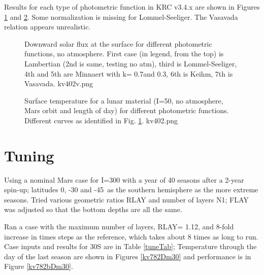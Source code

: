 \documentclass{article}
\begin{document}
Results for each type of photometric function in KRC v3.4.x are shown in Figures
\ref{kv402v} and \ref{kv402}. Some normalization is missing for
Lommel-Seeliger. The Vasavada relation appears unrealistic.
 
\begin{figure}[!ht] 
\caption[DownVis for photometric functions]{Downward solar flux at the surface
  for different photometric functions, no atmosphere. First case (in legend,
  from the top) is Lambertian (2nd is same, testing no atm), third is
  Lommel-Seeliger, 4th and 5th are Minnaert with k= 0.7and 0.3, 6th is Keihm,
  7th is Vasavada.
\label{kv402v}  kv402v.png }
\end{figure} 
 
\begin{figure}[!ht] 
\caption[Tsurf for photometric functions]{Surface temperature for a lunar
  material (I=50, no atmosphere, Mars orbit and length of day) for different
  photometric functions. Different curves as identified in Fig. \ref{kv402v}.
\label{kv402}  kv402.png }
\end{figure} 

\section{Tuning} 

Using a nominal Mars case for I=300 with a year of 40 seasons after a 2-year
spin-up; latitudes 0, -30 and -45\qd ~as the southern hemisphere as the more
extreme seasons. Tried various geometric ratios RLAY and number of layers N1;
FLAY was adjusted so that the bottom depths are all the same.


Ran a case with the maximum number of layers, RLAY= 1.12, and 8-fold increase in
times steps as the reference, which takes about 8 times as long to run. Case
inputs and results for 30\qd S are in Table \ref{tuneTab}; Temperature through
the day of the last season are shown in Figures \ref{kv782Dm30} and performance
is in Figure \ref{kv782bDm30}.
\end{document}
